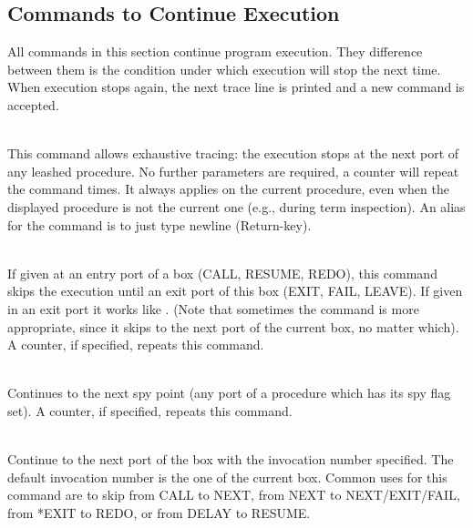 \subsection{Commands to Continue Execution}
All commands in this section continue program execution.
They difference between them is the condition under which execution
will stop the next time.  When execution stops again, the next trace
line is printed and a new command is accepted.

\begin{descr}{1cm}

\\
This command allows exhaustive tracing: the execution stops at the
next port of any leashed procedure.  No further parameters are
required, a counter  will repeat the command  times.
It always applies on the current procedure, even when the displayed
procedure is not the current one (e.g., during term inspection).
An alias for the  command is to just type newline (Return-key).

\\
If given at an entry port of a box (CALL, RESUME, REDO), this command skips
the execution until an exit port of this box (EXIT, FAIL, LEAVE).
If given in an exit port it works like .
(Note that sometimes the  command is more appropriate, since it
skips to the next port of the current box, no matter which).
A counter, if specified, repeats this command.


\\
Continues to the next spy point (any port of a procedure
which has its spy flag set).
A counter, if specified, repeats this command.

\\
Continue to the next port of the box with the invocation number
specified. The default invocation number is the one of the current box.
Common uses for this command are to skip from CALL to NEXT, from NEXT
to NEXT/EXIT/FAIL, from *EXIT to REDO, or from DELAY to RESUME.


\end{descr}
